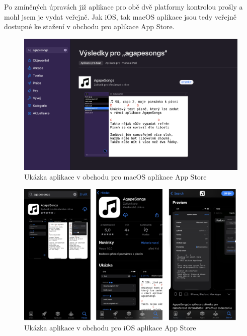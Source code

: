 Po zmíněných úpravách již aplikace pro obě dvě platformy kontrolou prošly a mohl jsem je vydat veřejně. Jak iOS, tak macOS aplikace jsou tedy veřejně dostupné ke stažení v obchodu pro aplikace App Store.

\begin{figure}[H]
    \includegraphics[width=\textwidth]{images/7-nasazeni/7-5-appstore-mac.png}
    \caption{Ukázka aplikace v obchodu pro macOS aplikace App Store}
\end{figure}

\begin{figure}[H]
    \includegraphics[width=\textwidth]{images/7-nasazeni/7-6-appstore-ios.png}
    \caption{Ukázka aplikace v obchodu pro iOS aplikace App Store}
\end{figure}
